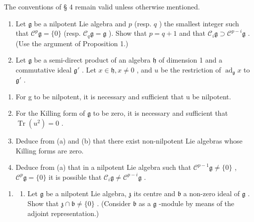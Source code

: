 
The conventions of § 4 remain valid unless otherwise mentioned.

\begin{enumerate}
\def\labelenumi{\arabic{enumi}.}
\item
  Let \(\mathfrak{g}\) be a nilpotent Lie algebra and \(p\) (resp. \(q\) ) the smallest integer such that \(\mathcal{C}^p\mathfrak{g} = \{0\}\) (resp. \(\mathcal{C}_q\mathfrak{g} = \mathfrak{g}\) ). Show that \(p = q + 1\) and that \(\mathcal{C}_i\mathfrak{g} \supset \mathcal{C}^{p - i}\mathfrak{g}\) . (Use the argument of Proposition 1.)
\item
  Let \(\mathfrak{g}\) be a semi-direct product of an algebra \(\mathfrak{h}\) of dimension 1 and a commutative ideal \(\mathfrak{g}'\) . Let \(x \in \mathfrak{h}, x \neq 0\) , and \(u\) be the restriction of \(\operatorname{ad}_{\mathfrak{g}} x\) to \(\mathfrak{g}'\) .
\end{enumerate}

\begin{enumerate}
\def\labelenumi{(\alph{enumi})}
\item
  For g to be nilpotent, it is necessary and sufficient that u be nilpotent.
\item
  For the Killing form of \(\mathfrak{g}\) to be zero, it is necessary and sufficient that \(\operatorname{Tr}(u^2) = 0\) .
\item
  Deduce from (a) and (b) that there exist non-nilpotent Lie algebras whose Killing forms are zero.
\item
  Deduce from (a) that in a nilpotent Lie algebra such that \(\mathcal{C}^{p-1}\mathfrak{g} \neq \{0\}\) , \(\mathcal{C}^p\mathfrak{g} = \{0\}\) it is possible that \(\mathcal{C}_i\mathfrak{g} \neq \mathcal{C}^{p-i}\mathfrak{g}\) .
\end{enumerate}

\begin{enumerate}
\def\labelenumi{\arabic{enumi}.}
\setcounter{enumi}{2}
\tightlist
\item
  \begin{enumerate}
  \def\labelenumii{(\alph{enumii})}
  \tightlist
  \item
    Let \(\mathfrak{g}\) be a nilpotent Lie algebra, \(\mathfrak{z}\) its centre and \(\mathfrak{b}\) a non-zero ideal of \(\mathfrak{g}\) . Show that \(\mathfrak{z} \cap \mathfrak{b} \neq \{0\}\) . (Consider \(\mathfrak{b}\) as a \(\mathfrak{g}\) -module by means of the adjoint representation.)
  \end{enumerate}
\end{enumerate}

